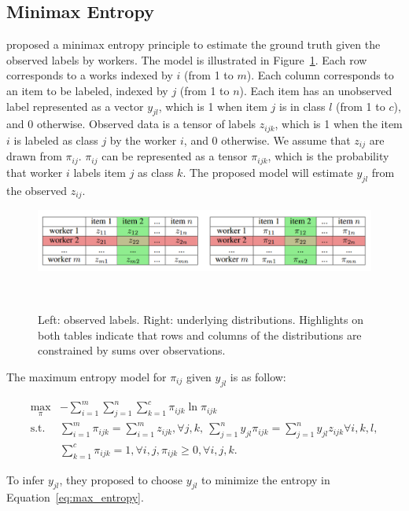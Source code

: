 \documentclass{article}
\begin{document}
\subsection{Minimax Entropy}
\cite{Zhou2012-ry} proposed a minimax entropy principle to estimate
the ground truth given the observed labels by workers. The model is
illustrated in Figure~\ref{fg:minimax_entropy_model}. Each row
corresponds to a works indexed by $i$ (from 1 to $m$). Each column
corresponds to an item to be labeled, indexed by $j$ (from 1 to
$n$). Each item has an unobserved label represented as a vector
$y_{jl}$, which is 1 when item $j$ is in class $l$ (from 1 to $c$),
and 0 otherwise. Observed data is a tensor of labels $z_{ijk}$, which
is 1 when the item $i$ is labeled as class $j$ by the worker $i$, and
0 otherwise. We assume that $z_{ij}$ are drawn from
$\pi_{ij}$. $\pi_{ij}$ can be represented as a tensor $\pi_{ijk}$,
which is the probability that worker $i$ labels item $j$ as class
$k$. The proposed model will estimate $y_{jl}$ from the observed
$z_{ij}$.
\begin{figure}[h]
  \centering
  \includegraphics[width=0.95\columnwidth]{minimax_entropy.png}
  \caption{Left: observed labels. Right: underlying
    distributions. Highlights on both tables indicate that rows and
    columns of the distributions are constrained by sums over observations.}
  ~\label{fg:minimax_entropy_model}
\end{figure}

The maximum entropy model for $\pi_{ij}$ given $y_{jl}$ is as
follow:

\begin{align}
\max_{\pi} & -\sum_{i=1}^{m}\sum_{j=1}^{n}\sum_{k=1}^{c} \pi_{ijk}
\ln \pi_{ijk} \nonumber \\
  \mathrm{s.t.} & \sum_{i=1}^{m}\pi_{ijk} = \sum_{i=1}^{m}z_{ijk},
                  \forall j,k, ~ \sum_{j=1}^{n}y_{jl}\pi_{ijk} =
                  \sum_{j=1}^{n}y_{jl}z_{ijk} \forall i,k,l, \nonumber
  \\
  & \sum_{k=1}^{c}\pi_{ijk}=1, \forall i,j, \pi_{ijk} \geq 0, \forall
    i,j,k. \label{eq:max_entropy}
\end{align}

To infer $y_{jl}$, they proposed to choose $y_{jl}$ to minimize the
entropy in Equation~\ref{eq:max_entropy}.
\end{document}
